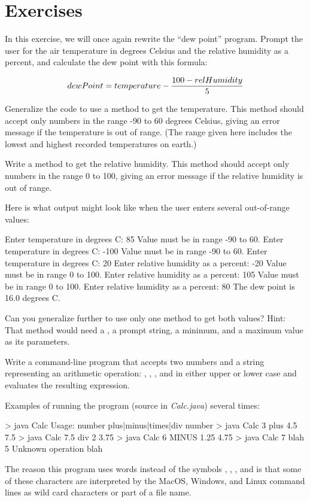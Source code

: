 \section{Exercises}

\begin{exercise}
In this exercise, we will once again rewrite the ``dew point'' program. Prompt the user for the air temperature in degrees Celsius and the relative humidity as a percent, and calculate the dew point with this formula:

\begin{equation*}
dewPoint = temperature - {{100 - relHumidity} \over 5}
\end{equation*}

Generalize the code to use a method to get the temperature. This method should accept only numbers in the range -90 to 60 degrees Celsius, giving an error message if the temperature is out of range. (The range given here includes the lowest and highest recorded temperatures on earth.)

Write a method to get the relative humidity. This method should accept only numbers in the range 0 to 100, giving an error message if the relative humidity is out of range.

Here is what output might look like when the user enters several out-of-range values:

\begin{stdout}
Enter temperature in degrees C: 85
Value must be in range -90 to 60.
Enter temperature in degrees C: -100
Value must be in range -90 to 60.
Enter temperature in degrees C: 20
Enter relative humidity as a percent: -20
Value must be in range 0 to 100.
Enter relative humidity as a percent: 105
Value must be in range 0 to 100.
Enter relative humidity as a percent: 80
The dew point is 16.0 degrees C.
\end{stdout}

Can you generalize further to use only one method to get both values?  Hint: That method would need a , a prompt string, a minimum, and a maximum value as its parameters.
\end{exercise}


\begin{exercise}
Write a command-line program that accepts two numbers and a string representing an arithmetic operation: , , , and  in either upper or lower case and evaluates the resulting expression.

Examples of running the program (source in {\em Calc.java}) several times:

\begin{stdout}
> java Calc
Usage: number plus|minus|times|div number
> java Calc 3 plus 4.5
7.5
> java Calc 7.5 div 2
3.75
> java Calc 6 MINUS 1.25
4.75
> java Calc 7 blah 5
Unknown operation blah
\end{stdout}

The reason this program uses words instead of the symbols \java{+}, \java{-}, \java{*}, and \java{/} is that some of these characters are interpreted by the MacOS, Windows, and Linux command lines as wild card characters or part of a file name.
\end{exercise}
